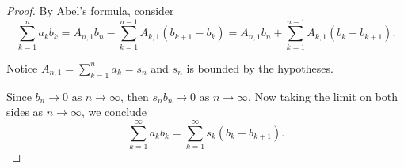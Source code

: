 \begin{Exercise}
\begin{proof}
By Abel's formula, consider 
$$
\sum_{k=1}^{n}a_k b_k 
=  A_{n,1}b_n - \sum_{k=1}^{n-1}A_{k,1}(b_{k+1}-b_k)
= A_{n,1}b_n + \sum_{k=1}^{n-1}A_{k,1}(b_k-b_{k+1}).
$$ 

Notice $A_{n,1} = \sum_{k=1}^{n}a_k = s_n$ and $s_n$ is bounded by the hypotheses. 

Since $b_n\to 0\text{ as } n\to\infty$, then $s_n b_n\to 0\text{ as } n\to\infty$. Now taking the limit on both sides as $n\to\infty$, we conclude  
$$
\sum_{k=1}^{\infty}a_k b_k 
= \sum_{k=1}^{\infty}s_k (b_k - b_{k+1}).
$$
\end{proof}
\end{Exercise}